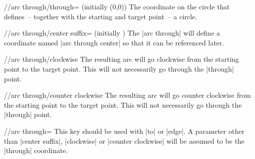 \begin{multicols}{2}
\begin{key}{/\tikzext/arc through/through= (initially {(0,0)})}
  The coordinate on the circle that defines~-- together with the
  starting and target point~-- a circle.
\end{key}

\begin{key}{/\tikzext/arc through/center suffix= (initially {})}
  The |arc through| will define a coordinate named |arc through center|
  so that it can be referenced later.
\end{key}

\begin{key}{/\tikzext/arc through/clockwise}
  The resulting arc will go clockwise from the starting point to the target point.
  This will not necessarily go through the |through| point.
\end{key}

\begin{key}{/\tikzext/arc through/counter clockwise}
  The resulting arc will go counter clockwise from the starting point to the target point.
  This will not necessarily go through the |through| point.
\end{key}

\begin{key}{/\tikzext/arc through=}
  This key should be used with |to| or |edge|.
  A parameter other than |center suffix|, |clockwise| or |counter clockwise| will
  be assumed to be the |through| coordinate.
\end{key}
\end{multicols}
\endinput